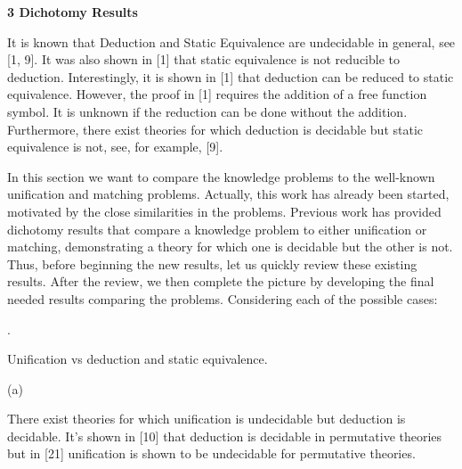 \documentclass[10pt,a4paper]{amsart}
\begin{document}
 
 
 

 
\par\medskip\noindent\textbf{3 Dichotomy Results}\par
 
 
It is known that Deduction and Static Equivalence are undecidable in general, see [1, 9]. It was also shown in [1] that static equivalence is not reducible to deduction. Interestingly, it is shown in [1] that deduction can be reduced to static equivalence. However, the proof in [1] requires the addition of a free function symbol. It is unknown if the reduction can be done without the addition. Furthermore, there exist theories for which deduction is decidable but static equivalence is not, see, for example, [9].\par
 
 
 
In this section we want to compare the knowledge problems to the well-known unification and matching problems. Actually, this work has already been started, motivated by the close similarities in the problems. Previous work has provided dichotomy results that compare a knowledge problem to either unification or matching, demonstrating a theory for which one is decidable but the other is not. Thus, before beginning the new results, let us quickly review these existing results. After the review, we then complete the picture by developing the final needed results comparing the problems. Considering each of the possible cases:\par
  
\par{}. 
 
Unification vs deduction and static equivalence.\par
  
\par\noindent  (a) 
 
There exist theories for which unification is undecidable but deduction is decidable. It’s shown in [10] that deduction is decidable in permutative theories but in [21] unification is shown to be undecidable for permutative theories.\par
 
\end{document}
